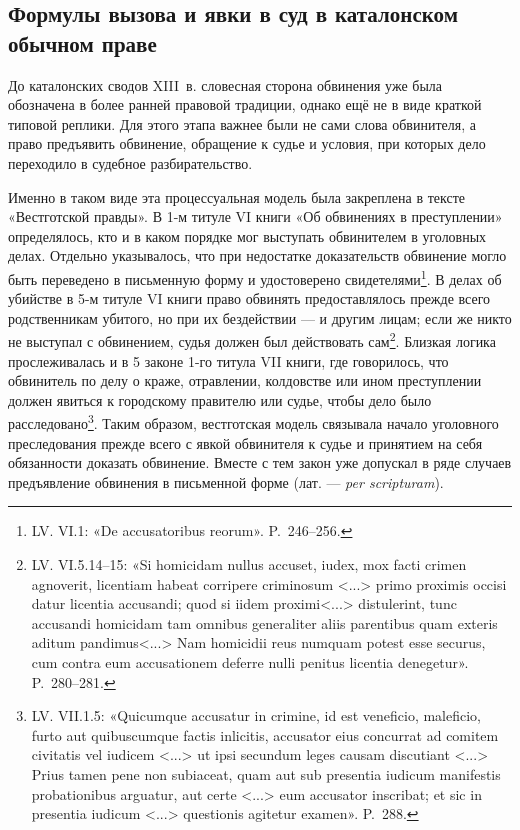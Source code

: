 \subsection{Формулы вызова и явки в суд в каталонском обычном праве}

До каталонских сводов XIII~в. словесная сторона обвинения уже была обозначена в более ранней правовой традиции, однако ещё не в виде краткой типовой реплики. Для этого этапа важнее были не сами слова обвинителя, а право предъявить обвинение, обращение к судье и условия, при которых дело переходило в судебное разбирательство.

Именно в таком виде эта процессуальная модель была закреплена в тексте «Вестготской правды». В 1-м титуле VI книги «Об обвинениях в преступлении» определялось, кто и в каком порядке мог выступать обвинителем в уголовных делах. Отдельно указывалось, что при недостатке доказательств обвинение могло быть переведено в письменную форму и удостоверено свидетелями\footnote{LV. VI.1: «De accusatoribus reorum». P.~246--256.}. В делах об убийстве в 5-м титуле VI книги право обвинять предоставлялось прежде всего родственникам убитого, но при их бездействии --- и другим лицам; если же никто не выступал с обвинением, судья должен был действовать сам\footnote{LV. VI.5.14--15: «Si homicidam nullus accuset, iudex, mox facti crimen agnoverit, licentiam habeat corripere criminosum <...> primo proximis occisi datur licentia accusandi; quod si iidem proximi<...> distulerint, tunc accusandi homicidam tam omnibus generaliter aliis parentibus quam exteris aditum pandimus<...> Nam homicidii reus numquam potest esse securus, cum contra eum accusationem deferre nulli penitus licentia denegetur». P.~280--281.}. Близкая логика прослеживалась и в 5 законе 1-го титула VII книги, где говорилось, что обвинитель по делу о краже, отравлении, колдовстве или ином преступлении должен явиться к городскому правителю или судье, чтобы дело было расследовано\footnote{LV. VII.1.5: «Quicumque accusatur in crimine, id est veneficio, maleficio, furto aut quibuscumque factis inlicitis, accusator eius concurrat ad comitem civitatis vel iudicem <...> ut ipsi secundum leges causam discutiant <...> Prius tamen pene non subiaceat, quam aut sub presentia iudicum manifestis probationibus arguatur, aut certe <...> eum accusator inscribat; et sic in presentia iudicum <...> questionis agitetur examen». P.~288.}. Таким образом, вестготская модель связывала начало уголовного преследования прежде всего с явкой обвинителя к судье и принятием на себя обязанности доказать обвинение. Вместе с тем закон уже допускал в ряде случаев предъявление обвинения в письменной форме (лат. --- \emph{per scripturam}).

